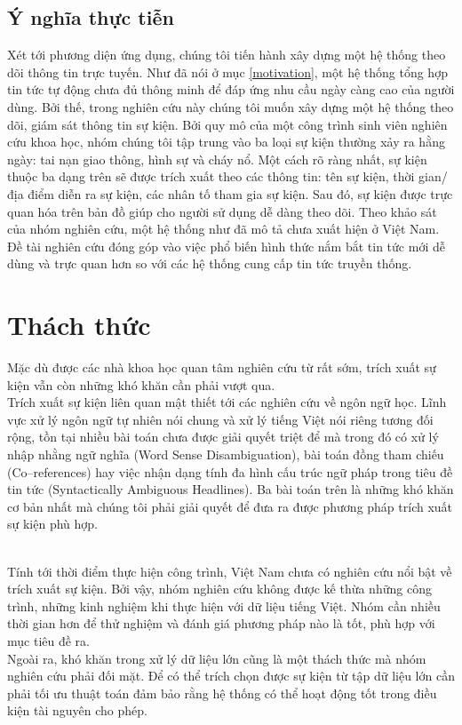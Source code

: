     \subsection{Ý nghĩa thực tiễn}

\noindent Xét tới  phương diện  ứng dụng, chúng tôi tiến hành xây dựng một hệ thống theo dõi thông tin trực tuyến. Như đã nói ở mục \ref{motivation}, một hệ thống tổng hợp tin tức tự động chưa đủ thông minh để đáp ứng nhu cầu ngày càng cao của người dùng. Bởi thế, trong nghiên cứu này chúng tôi muốn xây dựng một hệ thống theo dõi, giám sát thông tin sự kiện. Bởi quy mô của một công trình sinh viên nghiên cứu khoa học, nhóm chúng tôi tập trung vào ba loại sự kiện thường xảy ra hằng ngày: tai nạn giao thông, hình sự và cháy nổ. Một cách rõ ràng nhất, sự kiện thuộc ba dạng trên sẽ được trích xuất theo các thông tin: tên sự kiện, thời gian/địa điểm diễn ra sự kiện, các nhân tố tham gia sự kiện. Sau đó, sự kiện được trực quan hóa trên  bản đồ giúp cho người sử dụng dễ dàng theo dõi. Theo khảo sát của nhóm nghiên cứu, một hệ thống như đã mô tả chưa xuất hiện ở Việt Nam. Đề tài nghiên cứu đóng góp vào việc phổ biến hình thức nắm bắt tin tức mới dễ dùng và trực quan hơn so với các hệ thống cung cấp tin tức truyền thống.


 \section{Thách thức}
   \noindent  Mặc dù được các nhà khoa học quan tâm nghiên cứu  từ rất sớm, trích xuất sự kiện vẫn còn những khó khăn cần phải vượt qua. \\
\noindent Trích xuất sự kiện liên quan mật thiết tới các nghiên cứu về ngôn ngữ học. Lĩnh vực xử lý ngôn ngữ tự nhiên nói chung và xử lý tiếng Việt nói riêng tương đối rộng, tồn tại nhiều bài toán chưa được giải quyết triệt để mà trong đó có  xử lý nhập nhằng ngữ nghĩa (Word Sense Disambiguation), bài toán đồng tham chiếu (Co--references) hay việc nhận dạng tính đa hình cấu trúc ngữ pháp trong tiêu đề tin tức (Syntactically  Ambiguous Headlines). Ba bài toán trên là những khó khăn cơ bản nhất mà chúng tôi phải giải quyết để đưa ra được phương pháp trích xuất sự kiện phù hợp.

\\
\noindent Tính tới thời điểm thực hiện công trình, Việt Nam chưa có nghiên cứu nổi bật về trích xuất sự kiện. Bởi vậy, nhóm nghiên cứu không được kế thừa những công trình, những kinh nghiệm khi thực hiện với dữ liệu tiếng Việt. Nhóm cần nhiều thời gian hơn để thử nghiệm và đánh giá phương pháp nào là tốt, phù hợp với mục tiêu đề ra. 
\\
\noindent Ngoài ra, khó khăn trong xử lý dữ liệu lớn cũng là một thách thức mà nhóm nghiên cứu phải đối mặt. Để có thể trích chọn được sự kiện từ tập dữ liệu lớn cần phải tối ưu thuật toán đảm bảo rằng hệ thống có thể hoạt động tốt trong điều kiện tài nguyên cho phép.


